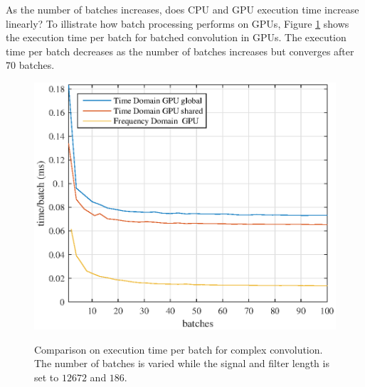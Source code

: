 As the number of batches increases, does CPU and GPU execution time increase linearly?
To illistrate how batch processing performs on GPUs, Figure \ref{fig:CPUvsGPU_varyBatches_186taps_12672signal_timePerBatch} shows the execution time per batch for batched convolution in GPUs.
The execution time per batch decreases as the number of batches increases but converges after $70$ batches.
\begin{figure}
	\centering\includegraphics[width=5in]{figures/gpu_intro/CPUvsGPU_varyBatches_186taps_12672signal_timePerBatch.eps}
	\label{fig:CPUvsGPU_varyBatches_186taps_12672signal_timePerBatch}
	\caption{Comparison on execution time per batch for complex convolution. The number of batches is varied while the signal and filter length is set to $12672$ and $186$.}
\end{figure}

